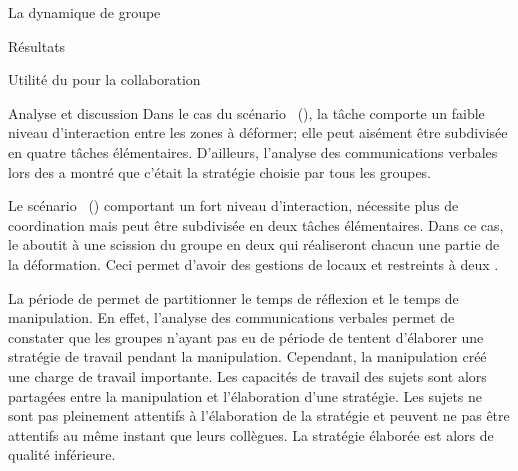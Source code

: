 \documentclass[myfrancais,ngerman,english,french]{mythesis}
\begin{document}
\begin{mychapter}{La dynamique de groupe}
\begin{mysection}{Résultats}
\begin{mysubsection}{Utilité du \mybrainstorming pour la collaboration}
\begin{mysubsubsection}{Analyse et discussion}
					Dans le cas du scénario~ (\myPrion), la tâche comporte un faible niveau d'interaction entre les zones à déformer; elle peut aisément être subdivisée en quatre tâches élémentaires.
					D'ailleurs, l'analyse des communications verbales lors des \mybrainstorming a montré que c'était la stratégie choisie par tous les groupes.

					Le scénario~ (\myUbiquitin) comportant un fort niveau d'interaction, nécessite plus de coordination mais peut être subdivisée en deux tâches élémentaires.
					Dans ce cas, le \mybrainstorming aboutit à une scission du groupe en deux  qui réaliseront chacun une partie de la déformation.
					Ceci permet d'avoir des gestions de  locaux et restreints à deux .

					La période de \mybrainstorming permet de partitionner le temps de réflexion et le temps de manipulation.
					En effet, l'analyse des communications verbales permet de constater que les groupes n'ayant pas eu de période de \mybrainstorming tentent d'élaborer une stratégie de travail pendant la manipulation.
					Cependant, la manipulation créé une charge de travail importante.
					Les capacités de travail des sujets sont alors partagées entre la manipulation et l'élaboration d'une stratégie.
					Les sujets ne sont pas pleinement attentifs à l'élaboration de la stratégie et peuvent ne pas être attentifs au même instant que leurs collègues.
					La stratégie élaborée est alors de qualité inférieure.


\end{mysubsubsection}
\end{mysubsection}
\end{mysection}
\end{mychapter}
\end{document}
